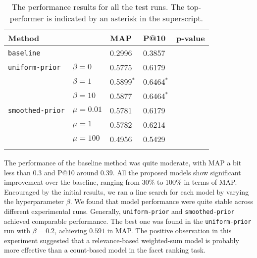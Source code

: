 \begin{table}[ht!]
  \centering
  \begin{tabular}{lllll}
    Method & & MAP & P@10 & p-value\\
    \hline
    {\tt baseline} & & 0.2996 & 0.3857 & \\
    {\tt uniform-prior} & $\beta = 0$ & 0.5775 & 0.6179 & \\
    & $\beta = 1$ & 0.5899$^*$ & 0.6464$^*$ & \\
    & $\beta = 10$ & 0.5877 & 0.6464$^*$ & \\
    {\tt smoothed-prior} & $\mu = 0.01$ & 0.5781 & 0.6179 &\\
    & $\mu = 1$ & 0.5782 & 0.6214 & \\
    & $\mu = 100$ & 0.4956 & 0.5429 & \\
    \\
  \end{tabular}
  \caption{The performance results for all the test runs.  The top-performer is
  indicated by an asterisk in the superscript.} \label{t:performance}
\end{table}

The performance of the baseline method was quite moderate, with MAP a bit less
than 0.3 and P@10 around 0.39.  All the proposed models show significant
improvement over the baseline, ranging from 30\% to 100\% in terms of MAP.
Encouraged by the initial results, we ran a line search for each model by
varying the hyperparameter $\beta$.  We found that model performance were quite
stable across different experimental runs.  Generally, {\tt uniform-prior} and
{\tt smoothed-prior} achieved comparable performance.  The best one was found
in the {\tt uniform-prior} run with $\beta = 0.2$, achieving $0.591$ in MAP.
The positive observation in this experiment suggested that a relevance-based
weighted-sum model is probably more effective than a count-based model in the
facet ranking task.  


